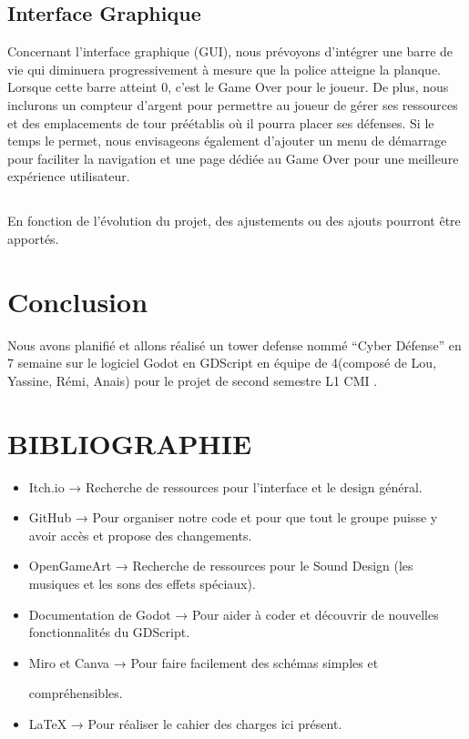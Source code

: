 \documentclass{article}
\begin{document}
\subsection*{Interface Graphique}
Concernant l'interface graphique (GUI), nous prévoyons d'intégrer une barre de vie qui diminuera progressivement à mesure que la police atteigne la planque. Lorsque cette barre atteint 0, c'est le Game Over pour le joueur. De plus, nous inclurons un compteur d'argent pour permettre au joueur de gérer ses ressources et des emplacements de tour préétablis où il pourra placer ses défenses. Si le temps le permet, nous envisageons également d'ajouter un menu de démarrage pour faciliter la navigation et une page dédiée au Game Over pour une meilleure expérience utilisateur.
\subsection*{}
En fonction de l'évolution du projet, des ajustements ou des ajouts pourront être apportés.

\section*{Conclusion}
Nous avons planifié et allons réalisé un tower defense nommé “Cyber Défense” en 7 semaine sur le logiciel Godot en GDScript en équipe de 4(composé de Lou, Yassine, Rémi, Anais) pour le projet de second semestre L1 CMI .

\noindent 

\newpage

\section*{BIBLIOGRAPHIE}

\begin{itemize}
    \item Itch.io → Recherche de ressources pour l’interface et le design général.
    \item GitHub → Pour organiser notre code et pour que tout le groupe puisse y avoir accès et propose des changements.
    \item OpenGameArt → Recherche de ressources pour le Sound Design (les musiques et les sons des effets spéciaux).
    \item Documentation de Godot → Pour aider à coder et découvrir de nouvelles fonctionnalités du GDScript.
    \item Miro et Canva → Pour faire facilement des schémas simples et \par compréhensibles.
    \item LaTeX → Pour réaliser le cahier des charges ici présent.
\end{itemize}
\end{document}
